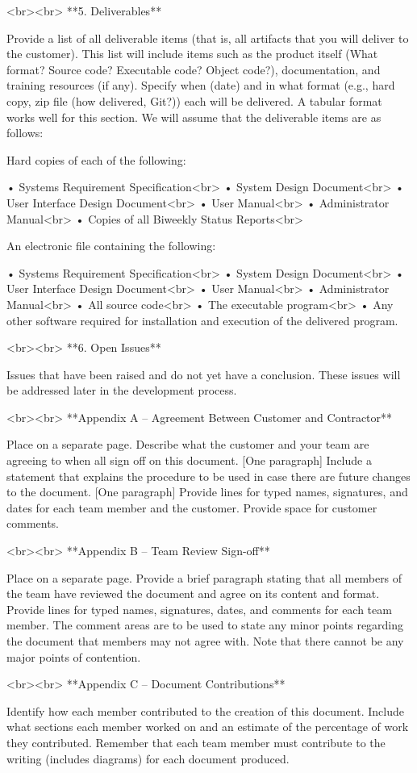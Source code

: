 \documentclass{article}
\begin{document}
<br><br>
**5.  Deliverables**

Provide a list of all deliverable items (that is, all artifacts that you will deliver to the customer).  This list will include items such as the product itself (What format? Source code? Executable code? Object code?), documentation, and training resources (if any).  Specify when (date) and in what format (e.g., hard copy, zip file (how delivered, Git?)) each will be delivered.  A tabular format works well for this section.  We will assume that the deliverable items are as follows:

Hard copies of each of the following:

•	Systems Requirement Specification<br>
•	System Design Document<br>
•	User Interface Design Document<br>
•	User Manual<br>
•	Administrator Manual<br>
•	Copies of all Biweekly Status Reports<br>

An electronic file containing the following: 

•	Systems Requirement Specification<br>
•	System Design Document<br>
•	User Interface Design Document<br>
•	User Manual<br> 
•	Administrator Manual<br> 
•	All source code<br>
•	The executable program<br>
•	Any other software required for installation and execution of the delivered program.

<br><br>
**6.  Open Issues**

Issues that have been raised and do not yet have a conclusion.  These issues will be addressed later in the development process.

<br><br>
**Appendix A – Agreement Between Customer and Contractor**

Place on a separate page. Describe what the customer and your team are agreeing to when all sign off on this document. [One paragraph] Include a statement that explains the procedure to be used in case there are future changes to the document. [One paragraph] Provide lines for typed names, signatures, and dates for each team member and the customer.  Provide space for customer comments.

<br><br>
**Appendix B – Team Review Sign-off**

Place on a separate page. Provide a brief paragraph stating that all members of the team have reviewed the document and agree on its content and format.  Provide lines for typed names, signatures, dates, and comments for each team member. The comment areas are to be used to state any minor points regarding the document that members may not agree with.  Note that there cannot be any major points of contention.

<br><br>
**Appendix C – Document Contributions**

Identify how each member contributed to the creation of this document. Include what sections each member worked on and an estimate of the percentage of work they contributed.  Remember that each team member must contribute to the writing (includes diagrams) for each document produced.
\fi
\end{document}

